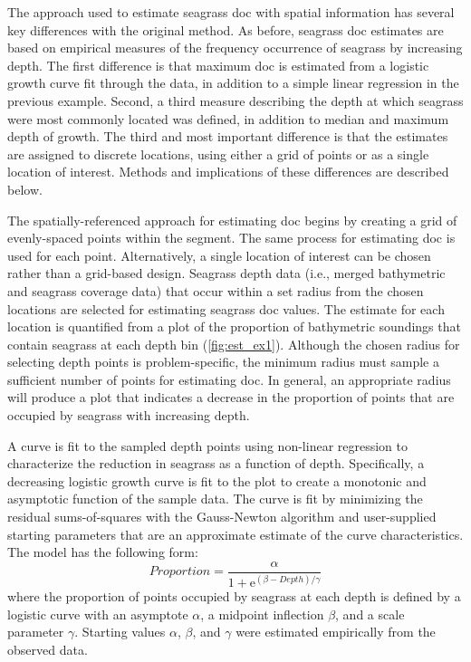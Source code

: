 \documentclass[letterpaper,12pt,oneside]{article}\usepackage[]{graphicx}\usepackage[]{color}
\begin{document}
The approach used to estimate seagrass \ac{doc} with spatial information has several key differences with the original method.  As before, seagrass \ac{doc} estimates are based on empirical measures of the frequency occurrence of seagrass by increasing depth.  The first difference is that maximum \ac{doc} is estimated from a logistic growth curve fit through the data, in addition to a simple linear regression in the previous example.  Second, a third measure describing the depth at which seagrass were most commonly located was defined, in addition to median and maximum depth of growth.  The third and most important difference is that the estimates are assigned to discrete locations, using either a grid of points or as a single location of interest. Methods and implications of these differences are described below.                                   

The spatially-referenced approach for estimating \ac{doc} begins by creating a grid of evenly-spaced points within the segment.  The same process for estimating \ac{doc} is used for each point.  Alternatively, a single location of interest can be chosen rather than a grid-based design.  Seagrass depth data (i.e., merged bathymetric and seagrass coverage data) that occur within a set radius from the chosen locations are selected for estimating seagrass \ac{doc} values. The estimate for each location is quantified from a plot of the proportion of bathymetric soundings that contain seagrass at each depth bin (\cref{fig:est_ex1}).  Although the chosen radius for selecting depth points is problem-specific, the minimum radius must sample a sufficient number of points for estimating \ac{doc}.  In general, an appropriate radius will produce a plot that indicates a decrease in the proportion of points that are occupied by seagrass with increasing depth.  

A curve is fit to the sampled depth points using non-linear regression to characterize the reduction in seagrass as a function of depth.  Specifically, a decreasing logistic growth curve is fit to the plot to create a monotonic and asymptotic function of the sample data.   The curve is fit by minimizing the residual sums-of-squares with the Gauss-Newton algorithm \citep{Bates92} and user-supplied starting parameters that are an approximate estimate of the curve characteristics.  The model has the following form:
\begin{equation} \label{eqn:prop}
 Proportion = \frac{\alpha}{1 + \mathrm{e}^{{\left(\beta - Depth\right)/\gamma}}}
\end{equation}
where the proportion of points occupied by seagrass at each depth is defined by a logistic curve with an asymptote $\alpha$, a midpoint inflection $\beta$, and a scale parameter $\gamma$.  Starting values $\alpha$, $\beta$, and $\gamma$ were estimated empirically from the observed data.  
\end{document}
